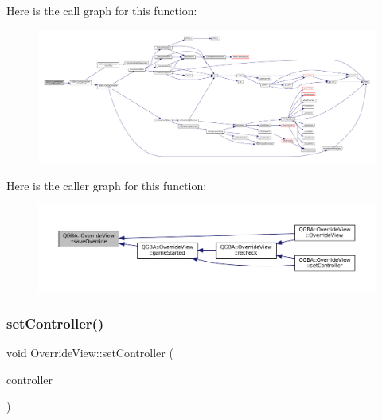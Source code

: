 Here is the call graph for this function\+:
\nopagebreak
\begin{figure}[H]
\begin{center}
\leavevmode
\includegraphics[width=350pt]{class_q_g_b_a_1_1_override_view_a5f4267251191520565245e35ffeb54dd_cgraph}
\end{center}
\end{figure}
Here is the caller graph for this function\+:
\nopagebreak
\begin{figure}[H]
\begin{center}
\leavevmode
\includegraphics[width=350pt]{class_q_g_b_a_1_1_override_view_a5f4267251191520565245e35ffeb54dd_icgraph}
\end{center}
\end{figure}
\mbox{\label{class_q_g_b_a_1_1_override_view_a2f0259e94cf4e7bcbc51f84e84c24574}} 
\subsubsection{\texorpdfstring{set\+Controller()}{setController()}}
{\footnotesize\ttfamily void Override\+View\+::set\+Controller (\begin{DoxyParamCaption}\item[{std\+::shared\+\_\+ptr$<$ \mbox{\hyperlink{class_q_g_b_a_1_1_core_controller}{Core\+Controller}} $>$}]{controller }\end{DoxyParamCaption})}

